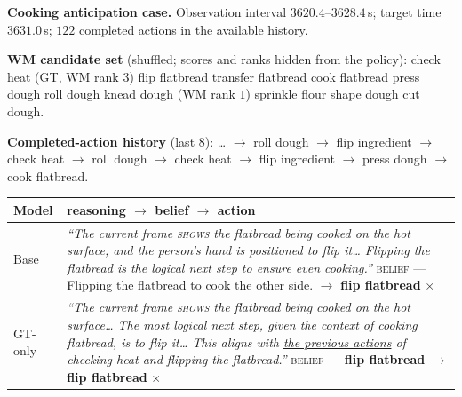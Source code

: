 \documentclass[letterpaper]{article}
\newcommand{\obs}[1]{\textcolor{measuredblue}{#1}}
\begin{document}
\addtocounter{table}{1}
\begin{table}[t]
\footnotesize
\setlength{\parindent}{0pt}
\textbf{Cooking anticipation case.} Observation interval
\obs{$3620.4$--$3628.4$}\,s; target time \obs{$3631.0$}\,s; \obs{$122$}
completed actions in the available history.\par
\smallskip
\textbf{WM candidate set} (shuffled; scores and ranks hidden from the policy):
check heat (GT, WM rank \obs{$3$}) \textperiodcentered{} flip flatbread
\textperiodcentered{} transfer flatbread \textperiodcentered{} cook flatbread
\textperiodcentered{} press dough \textperiodcentered{} roll dough
\textperiodcentered{} knead dough (WM rank \obs{$1$}) \textperiodcentered{}
sprinkle flour \textperiodcentered{} shape dough \textperiodcentered{} cut
dough.\par
\smallskip
\textbf{Completed-action history} (last \obs{$8$}): \ldots{} $\rightarrow$ roll
dough $\rightarrow$ flip ingredient $\rightarrow$ check heat $\rightarrow$ roll
dough $\rightarrow$ check heat $\rightarrow$ flip ingredient $\rightarrow$ press
dough $\rightarrow$ cook flatbread.\par
\medskip
\setlength{\tabcolsep}{6pt}
\begin{tabular}{@{}p{}p{}@{}}
\toprule
Model & reasoning $\rightarrow$ belief $\rightarrow$ action \\
\midrule
Base
  & \emph{``The current frame \textsc{shows} the flatbread being cooked on the
    hot surface, and the person's hand is positioned to flip it\ldots{}
    Flipping the flatbread is the logical next step to ensure even cooking.''}
    \newline
    \textsc{belief} --- Flipping the flatbread to cook the other side.
    \newline
    $\rightarrow$ \textbf{flip flatbread} $\times$
    \quad{\scriptsize[scene description via ``shows'']} \\
GT-only
  & \emph{``The current frame \textsc{shows} the flatbread being cooked on the
    hot surface\ldots{} The most logical next step, given the context of
    cooking flatbread, is to flip it\ldots{} This aligns with
    \underline{the previous actions} of checking heat and flipping the
    flatbread.''}
    \newline
    \textsc{belief} --- \textbf{flip flatbread}
    \quad{\scriptsize[action-copying belief]}
    \newline
    $\rightarrow$ \textbf{flip flatbread} $\times$

\end{tabular}
\end{table}
\end{document}
